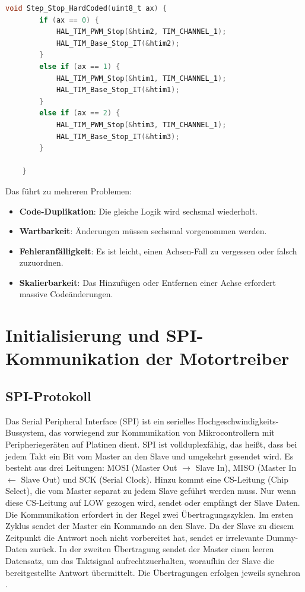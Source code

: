 \begin{lstlisting}[language=C, caption={Motor-Stopp ohne Array-Abstraktion (Anti-Pattern)}, 
	label={lst:hal_no_array}]
	void Step_Stop_HardCoded(uint8_t ax) {
		if (ax == 0) {
			HAL_TIM_PWM_Stop(&htim2, TIM_CHANNEL_1);
			HAL_TIM_Base_Stop_IT(&htim2);
		}
		else if (ax == 1) {
			HAL_TIM_PWM_Stop(&htim1, TIM_CHANNEL_1);
			HAL_TIM_Base_Stop_IT(&htim1);
		}
		else if (ax == 2) {
			HAL_TIM_PWM_Stop(&htim3, TIM_CHANNEL_1);
			HAL_TIM_Base_Stop_IT(&htim3);
		}
		
	}
\end{lstlisting}

Das führt zu mehreren Problemen:
\begin{itemize}
	\item \textbf{Code-Duplikation}: Die gleiche Logik wird sechsmal wiederholt.
	\item \textbf{Wartbarkeit}: Änderungen müssen sechsmal vorgenommen werden.
	\item \textbf{Fehleranfälligkeit}: Es ist leicht, einen Achsen-Fall zu vergessen oder falsch zuzuordnen.
	\item \textbf{Skalierbarkeit}: Das Hinzufügen oder Entfernen einer Achse erfordert massive Codeänderungen.
\end{itemize}


\section{Initialisierung und SPI-Kommunikation der Motortreiber}
\label{subsec:spi_init}
\subsection{SPI-Protokoll}
Das Serial Peripheral Interface (SPI) ist ein serielles Hochgeschwindigkeits-Bussystem, das vorwiegend zur Kommunikation von Mikrocontrollern mit Peripheriegeräten auf Platinen dient. SPI ist vollduplexfähig, das heißt, dass bei jedem Takt ein Bit vom Master an den Slave und umgekehrt gesendet wird. Es besteht aus drei Leitungen: MOSI (Master Out $\longrightarrow$ Slave In), MISO (Master In $\longleftarrow$ Slave Out) und SCK (Serial Clock). Hinzu kommt eine CS-Leitung (Chip Select), die vom Master separat zu jedem Slave geführt werden muss. Nur wenn diese CS-Leitung auf LOW gezogen wird, sendet oder empfängt der Slave Daten. Die Kommunikation erfordert in der Regel zwei Übertragungszyklen. Im ersten Zyklus sendet der Master ein Kommando an den Slave. Da der Slave zu diesem Zeitpunkt die Antwort noch nicht vorbereitet hat, sendet er irrelevante Dummy-Daten zurück. In der zweiten Übertragung sendet der Master einen leeren Datensatz, um das Taktsignal aufrechtzuerhalten, woraufhin der Slave die bereitgestellte Antwort übermittelt. Die Übertragungen erfolgen jeweils synchron \cite{a2025_serial}.


